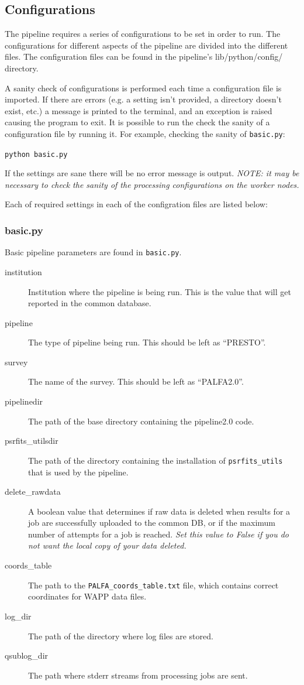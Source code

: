 \documentclass[12pt]{article}
\begin{document}
\subsection{Configurations}
\label{sec:configs}

The pipeline requires a series of configurations to be set in order to run. The configurations for different aspects of the pipeline are divided into the different files. The configuration files can be found in the pipeline's lib/python/config/ directory.

A sanity check of configurations is performed each time a configuration file is imported. If there are errors (e.g. a setting isn't provided, a directory doesn't exist, etc.) a message is printed to the terminal, and an exception is raised causing the program to exit. It is possible to run the check the sanity of a configuration file by running it. For example, checking the sanity of \texttt{basic.py}:

\texttt{python basic.py}

If the settings are sane there will be no error message is output. \textit{NOTE: it may be necessary to check the sanity of the processing configurations on the worker nodes.}

Each of required settings in each of the configration files are listed below:

\subsubsection{basic.py}
Basic pipeline parameters are found in \texttt{basic.py}.

\begin{description}
    \item[institution] Institution where the pipeline is being run. This is the value that will get reported in the common database.
    \item[pipeline] The type of pipeline being run. This should be left as ``PRESTO''.
    \item[survey] The name of the survey. This should be left as ``PALFA2.0''.
    \item[pipelinedir] The path of the base directory containing the pipeline2.0 code.
    \item[psrfits\_utilsdir] The path of the directory containing the installation of \texttt{psrfits\_utils} that is used by the pipeline.
    \item[delete\_rawdata] A boolean value that determines if raw data is deleted when results for a job are successfully uploaded to the common DB, or if the maximum number of attempts for a job is reached. \textit{Set this value to False if you do not want the local copy of your data deleted.}
    \item[coords\_table] The path to the \texttt{PALFA\_coords\_table.txt} file, which contains correct coordinates for WAPP data files.
    \item[log\_dir] The path of the directory where log files are stored.
    \item[qsublog\_dir] The path where stderr streams from processing jobs are sent.
\end{description}
\end{document}

